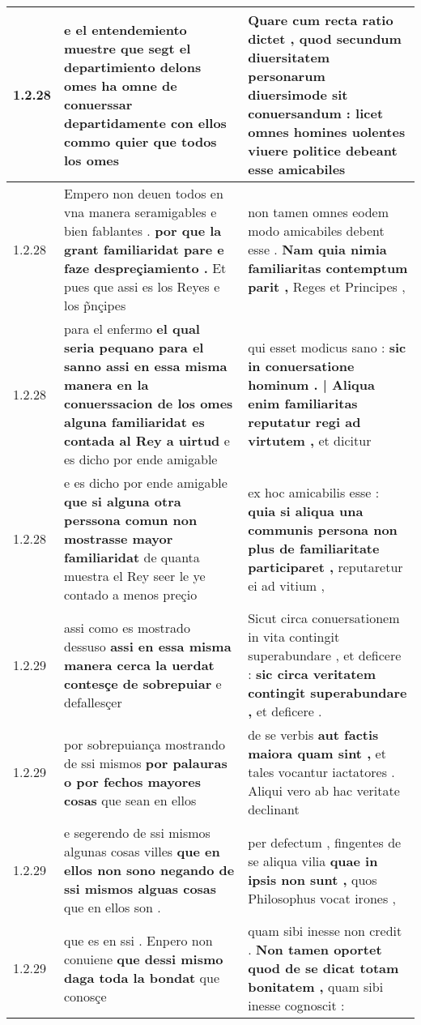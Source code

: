 \begin{tabular}{|p{1cm}|p{6.5cm}|p{6.5cm}|}
1.2.28 & e el entendemiento muestre \textbf{ que segt el departimiento delons omes ha omne de conuerssar departidamente con ellos } commo quier que todos los omes & Quare cum recta ratio dictet , \textbf{ quod } secundum diuersitatem personarum diuersimode sit conuersandum : licet omnes homines uolentes viuere politice debeant esse amicabiles \\\hline
1.2.28 & Empero non deuen todos en vna manera seramigables e bien fablantes . \textbf{ por que la grant familiaridat pare e faze despreçiamiento . } Et pues que assi es los Reyes e los p̃nçipes & non tamen omnes eodem modo amicabiles debent esse . \textbf{ Nam quia nimia familiaritas contemptum parit , } Reges et Principes , \\\hline
1.2.28 & para el enfermo \textbf{ el qual seria pequano para el sanno assi en essa misma manera en la conuerssacion de los omes alguna familiaridat es contada al Rey a uirtud } e es dicho por ende amigable & qui esset modicus sano : \textbf{ sic in conuersatione hominum . | Aliqua enim familiaritas reputatur regi ad virtutem , } et dicitur \\\hline
1.2.28 & e es dicho por ende amigable \textbf{ que si alguna otra perssona comun non mostrasse mayor familiaridat } de quanta muestra el Rey seer le ye contado a menos preçio & ex hoc amicabilis esse : \textbf{ quia si aliqua una communis persona non plus de familiaritate participaret , } reputaretur ei ad vitium , \\\hline
1.2.29 & assi como es mostrado dessuso \textbf{ assi en essa misma manera cerca la uerdat contesçe de sobrepuiar } e defallesçer & Sicut circa conuersationem in vita contingit superabundare , et deficere : \textbf{ sic circa veritatem contingit superabundare , } et deficere . \\\hline
1.2.29 & por sobrepuiança mostrando de ssi mismos \textbf{ por palauras o por fechos mayores cosas } que sean en ellos & de se verbis \textbf{ aut factis maiora quam sint , } et tales vocantur iactatores . Aliqui vero ab hac veritate declinant \\\hline
1.2.29 & e segerendo de ssi mismos algunas cosas villes \textbf{ que en ellos non sono negando de ssi mismos alguas cosas } que en ellos son . & per defectum , fingentes de se aliqua vilia \textbf{ quae in ipsis non sunt , } quos Philosophus vocat irones , \\\hline
1.2.29 & que es en ssi . Enpero non conuiene \textbf{ que dessi mismo daga toda la bondat } que conosçe & quam sibi inesse non credit . \textbf{ Non tamen oportet quod de se dicat totam bonitatem , } quam sibi inesse cognoscit : \\\hline

\end{tabular}
